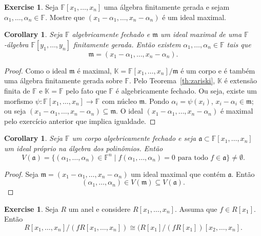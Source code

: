 \documentclass[12pt]{amsart}
\renewcommand{\a}{\mathfrak a}
\newcommand{\m}{\mathfrak m}
\newcommand{\F}{\mathbb F}
\newcommand{\K}{\mathbb K}
\newtheorem{corollary}[theorem]{Corollary}
\theoremstyle{definition}
\newtheorem{exercise}[theorem]{Exercise}
\begin{document}
\begin{exercise}
    Seja $\F[x_1,\ldots,x_n]$ uma álgebra finitamente gerada e sejam $\alpha_1,\ldots,\alpha_n\in \F$. 
    Mostre que $(x_1-\alpha_1,\ldots,x_n-\alpha_n)$ é um ideal maximal.
\end{exercise}

\begin{corollary}
    Seja $\F$ algebricamente fechado e $\m$ um ideal maximal de uma $\F$-álgebra $\F[y_1,\ldots,y_n]$ 
    finitamente gerada. Então existem $\alpha_1,\ldots,\alpha_n\in\F$ tais que 
    \[
        \m=(x_1-\alpha_1,\ldots,x_n-\alpha_n).
    \]
\end{corollary}
\begin{proof}
    Como o ideal $\m$ é maximal, $\K=\F[x_1,\ldots,x_n]/\m$ é um corpo e é também uma álgebra finitamente 
    gerada sobre $\F$. Pelo Teorema~\ref{th:zariski}, $\K$ é extensão finita de $\F$ e $\K=\F$ pelo fato que 
    $\F$ é algebricamente fechado. Ou seja, existe um morfismo $\psi: \F[x_1,\ldots,x_n]\to\F$ com núcleo 
    $\m$. Pondo $\alpha_i=\psi(x_i)$, $x_i-\alpha_i\in \m$; 
    ou seja $(x_1-\alpha_1,\ldots,x_n-\alpha_n)\subseteq \m$. O ideal $(x_1-\alpha_1,\ldots,x_n-\alpha_n)$ é maximal pelo exercício anterior que implica igualdade. 
\end{proof}

\begin{corollary}
    Seja $\F$ um corpo algebricamente fechado e seja $\a\subset \F[x_1,\ldots,x_n]$ um ideal próprio na álgebra 
    dos polinômios. Então 
    \[
        V(\a)=\{(\alpha_1,\ldots,\alpha_n)\in\F^n\mid f(\alpha_1,\ldots,\alpha_n)=0\mbox{ para todo }f\in \a\}\neq \emptyset.
    \]
\end{corollary}
\begin{proof}
    Seja $\m=(x_1-\alpha_1,\ldots,x_n-\alpha_n)$ um ideal maximal que contém $\a$. Então 
    \[
        (\alpha_1,\ldots,\alpha_n)\in V(\m)\subseteq V(\a).
    \]
\end{proof}

\begin{exercise}
    Seja $R$ um anel e considere $R[x_1,\ldots,x_n]$. Assuma que $f\in R[x_1]$. Então 
    \[
        R[x_1,\ldots,x_n]/(fR[x_1,\ldots,x_n])\cong (R[x_1]/(fR[x_1])[x_2,\ldots,x_n]. 
    \]
\end{exercise}
\end{document}
